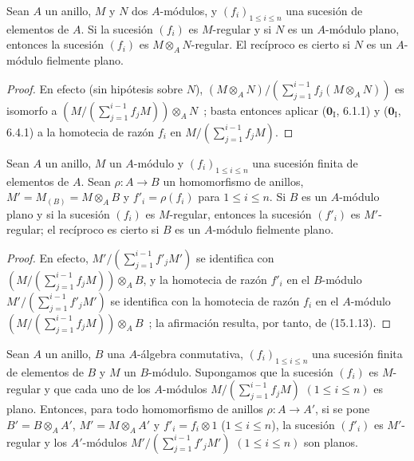 \begin{proposition}[15.1.13]
\label{0.15.1.13-fr}
Sean $A$ un anillo, $M$ y $N$ dos $A$-módulos, y
$(f_i)_{1\leq i\leq n}$ una sucesión de elementos de $A$. Si la sucesión
$(f_i)$ es $M$-regular y si $N$ es un $A$-módulo plano, entonces la sucesión
$(f_i)$ es $M\otimes_A N$-regular. El recíproco es cierto si $N$ es un
$A$-módulo fielmente plano.
\end{proposition}

\begin{proof}
En efecto (sin hipótesis sobre $N$),
$(M\otimes_A N)/(\sum_{j=1}^{i-1}f_j(M\otimes_A N))$
es isomorfo a
$(M/(\sum_{j=1}^{i-1}f_jM))\otimes_A N$~;
basta entonces aplicar ($\mathbf{0}_{\mathrm I}$, 6.1.1) y
($\mathbf{0}_{\mathrm I}$, 6.4.1) a la homotecia de razón $f_i$ en
$M/(\sum_{j=1}^{i-1}f_jM)$.
\end{proof}

\begin{corollary}[15.1.14]
\label{0.15.1.14-fr}
Sean $A$ un anillo, $M$ un $A$-módulo y $(f_i)_{1\leq i\leq n}$ una sucesión
finita de elementos de $A$. Sean $\rho:A\to B$ un homomorfismo de anillos,
$M'=M_{(B)}=M\otimes_A B$ y $f'_i=\rho(f_i)$ para $1\leq i\leq n$. Si $B$ es
un $A$-módulo plano y si la sucesión $(f_i)$ es $M$-regular, entonces la
sucesión $(f'_i)$ es $M'$-regular; el recíproco es cierto si $B$ es un
$A$-módulo fielmente plano.
\end{corollary}

\begin{proof}
En efecto,
$M'/(\sum_{j=1}^{i-1}f'_jM')$
se identifica con
$(M/(\sum_{j=1}^{i-1}f_jM))\otimes_A B$,
y la homotecia de razón $f'_i$ en el $B$-módulo
$M'/(\sum_{j=1}^{i-1}f'_jM')$ se identifica con la homotecia de razón $f_i$
en el $A$-módulo
$(M/(\sum_{j=1}^{i-1}f_jM))\otimes_A B$~;
la afirmación resulta, por tanto, de (15.1.13).
\end{proof}

\begin{proposition}[15.1.15]
\label{0.15.1.15-fr}
Sean $A$ un anillo, $B$ una $A$-álgebra conmutativa,
$(f_i)_{1\leq i\leq n}$ una sucesión finita de elementos de $B$ y $M$ un
$B$-módulo. Supongamos que la sucesión $(f_i)$ es $M$-regular y que cada uno
de los $A$-módulos
$M/(\sum_{j=1}^{i-1}f_jM)$ $(1\leq i\leq n)$
es plano. Entonces, para todo homomorfismo de anillos $\rho:A\to A'$, si se
pone $B'=B\otimes_A A'$, $M'=M\otimes_A A'$ y $f'_i=f_i\otimes1$
\textup{($1\leq i\leq n$)}, la sucesión $(f'_i)$ es $M'$-regular y los
$A'$-módulos
$M'/(\sum_{j=1}^{i-1}f'_jM')$ $(1\leq i\leq n)$
son planos.
\end{proposition}


